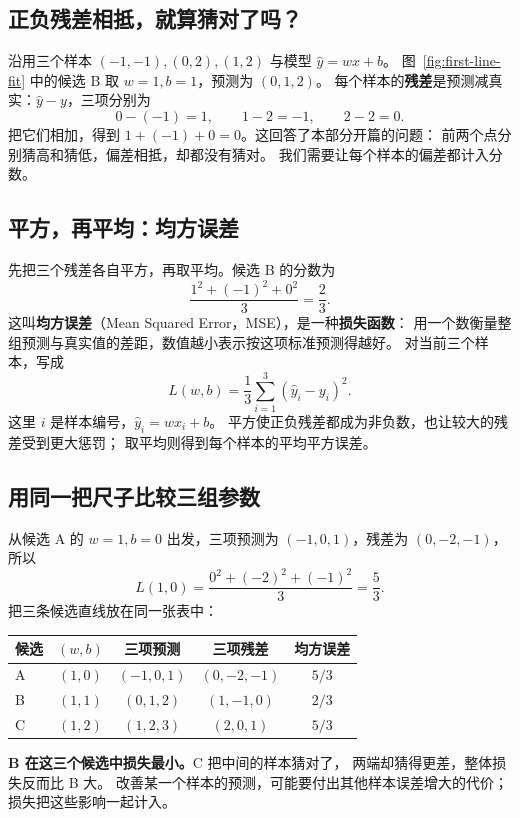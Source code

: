 

\subsection{正负残差相抵，就算猜对了吗？}
\label{concept:loss}

沿用三个样本 $(-1,-1),(0,2),(1,2)$ 与模型 $\widehat{y}=wx+b$。
图~\ref{fig:first-line-fit} 中的候选 B 取 $w=1,b=1$，预测为 $(0,1,2)$。
每个样本的\textbf{残差}是预测减真实：$\widehat{y}-y$，三项分别为
\[
0-(-1)=1,\qquad 1-2=-1,\qquad 2-2=0.
\]
\label{partq:learning}
把它们相加，得到 $1+(-1)+0=0$。这回答了本部分开篇的问题：
前两个点分别猜高和猜低，偏差相抵，却都没有猜对。
我们需要让每个样本的偏差都计入分数。

\subsection{平方，再平均：均方误差}

先把三个残差各自平方，再取平均。候选 B 的分数为
\[
\frac{1^2+(-1)^2+0^2}{3}=\frac23.
\]
这叫\textbf{均方误差}（Mean Squared Error，MSE），是一种\textbf{损失函数}：
用一个数衡量整组预测与真实值的差距，数值越小表示按这项标准预测得越好。
对当前三个样本，写成
\begin{equation}
\boxed{L(w,b)=\frac13\sum_{i=1}^{3}(\widehat{y}_i-y_i)^2.}
\label{eq:three-point-mse}
\end{equation}
这里 $i$ 是样本编号，$\widehat{y}_i=wx_i+b$。
平方使正负残差都成为非负数，也让较大的残差受到更大惩罚；
取平均则得到每个样本的平均平方误差。

\subsection{用同一把尺子比较三组参数}

从候选 A 的 $w=1,b=0$ 出发，三项预测为 $(-1,0,1)$，残差为 $(0,-2,-1)$，所以
\[
L(1,0)=\frac{0^2+(-2)^2+(-1)^2}{3}=\boxed{\frac53}.
\]
把三条候选直线放在同一张表中：
\begin{center}
\begin{tabular}{lcccc}
\toprule
候选 & $(w,b)$ & 三项预测 & 三项残差 & 均方误差\\\midrule
A & $(1,0)$ & $(-1,0,1)$ & $(0,-2,-1)$ & $5/3$\\
B & $(1,1)$ & $(0,1,2)$ & $(1,-1,0)$ & $2/3$\\
C & $(1,2)$ & $(1,2,3)$ & $(2,0,1)$ & $5/3$\\
\bottomrule
\end{tabular}
\end{center}
\textbf{B 在这三个候选中损失最小。}C 把中间的样本猜对了，
两端却猜得更差，整体损失反而比 B 大。
改善某一个样本的预测，可能要付出其他样本误差增大的代价；损失把这些影响一起计入。

